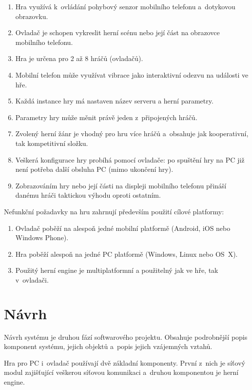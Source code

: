 \documentclass[thesis=B,czech,hidelinks]{FITthesis}[2012/06/26] %
\begin{document}
\begin{enumerate}
	\item Hra využívá k~ovládání pohybový senzor mobilního telefonu a~dotykovou obrazovku.
	\item Ovladač je schopen vykreslit herní scénu nebo její část na obrazovce mobilního telefonu.
	\item Hra je určena pro 2 až 8 hráčů (ovladačů).
	\item Mobilní telefon může využívat vibrace jako interaktivní odezvu na události ve hře.
 	\item Každá instance hry má nastaven název serveru a herní parametry.
	\item Parametry hry může měnit právě jeden z~připojených hráčů.
	\item Zvolený herní žánr je vhodný pro hru více hráčů a~obsahuje jak kooperativní, tak kompetitivní složku.
	\item Veškerá konfigurace hry probíhá pomocí ovladače: po spuštění hry na PC již není potřeba další obsluha PC (mimo ukončení hry).
	\item Zobrazováním hry nebo její části na displeji mobilního telefonu přináší danému hráči taktickou výhodu oproti ostatním.

\end{enumerate}

Nefunkční požadavky na hru zahrnují především použití cílové platformy:

\begin{enumerate}
	\item Ovladač poběží na alespoň jedné mobilní platformě (Android, iOS nebo Windows Phone).
	\item Hra poběží alespoň na jedné PC platformě (Windows, Linux nebo OS~X).
	\item Použitý herní engine je multiplatformní a použitelný jak ve hře, tak v~ovladači.
\end{enumerate}

\section{Návrh}

Návrh systému je druhou fází softwarového projektu. Obsahuje podrobnější popis komponent systému, jejich objektů a~popis jejich vzájemných vztahů.

Hra pro PC i~ovladač používají dvě základní komponenty. První z~nich je síťový modul zajišťující veškerou síťovou komunikaci a~druhou komponentou je herní engine. 
\end{document}
